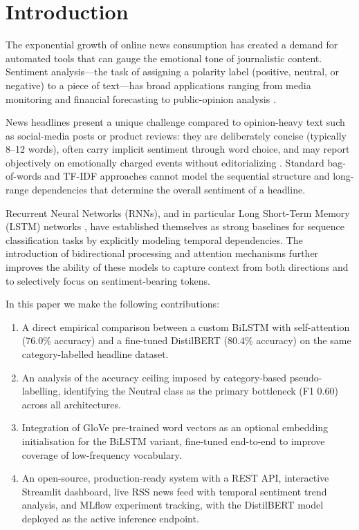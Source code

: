 \documentclass[conference]{IEEEtran}
\begin{document}
\section{Introduction}
\label{sec:intro}

The exponential growth of online news consumption has created a demand
for automated tools that can gauge the emotional tone of journalistic
content. Sentiment analysis—the task of assigning a polarity label
(positive, neutral, or negative) to a piece of text—has broad
applications ranging from media monitoring and financial forecasting to
public-opinion analysis \cite{liu2012sentiment}.

News headlines present a unique challenge compared to opinion-heavy
text such as social-media posts or product reviews: they are
deliberately concise (typically 8–12 words), often carry implicit
sentiment through word choice, and may report objectively on
emotionally charged events without editorializing
\cite{balahur2013sentiment}. Standard bag-of-words and TF-IDF
approaches cannot model the sequential structure and long-range
dependencies that determine the overall sentiment of a headline.

Recurrent Neural Networks (RNNs), and in particular Long Short-Term
Memory (LSTM) networks \cite{hochreiter1997lstm}, have established
themselves as strong baselines for sequence classification tasks by
explicitly modeling temporal dependencies. The introduction of
bidirectional processing \cite{schuster1997bilstm} and attention
mechanisms \cite{bahdanau2015attention} further improves the ability
of these models to capture context from both directions and to
selectively focus on sentiment-bearing tokens.

In this paper we make the following contributions:
\begin{enumerate}
  \item A direct empirical comparison between a custom BiLSTM with
        self-attention (76.0\% accuracy) and a fine-tuned DistilBERT
        (80.4\% accuracy) on the same category-labelled headline dataset.
  \item An analysis of the accuracy ceiling imposed by category-based
        pseudo-labelling, identifying the Neutral class as the primary
        bottleneck (F1 0.60) across all architectures.
  \item Integration of GloVe \cite{pennington2014glove} pre-trained
        word vectors as an optional embedding initialisation for the
        BiLSTM variant, fine-tuned end-to-end to improve coverage of
        low-frequency vocabulary.
  \item An open-source, production-ready system with a REST API,
        interactive Streamlit dashboard, live RSS news feed with
        temporal sentiment trend analysis, and MLflow experiment
        tracking, with the DistilBERT model deployed as the active
        inference endpoint.
\end{enumerate}
\end{document}
